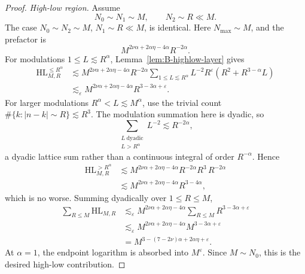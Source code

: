 \documentclass[10pt]{amsart}
\numberwithin{equation}{section}
\theoremstyle{plain}
\theoremstyle{definition}
\theoremstyle{remark}
\newcommand{\eps}{\varepsilon}
\begin{document}
\begin{proof}
\emph{High-low region.}  Assume
\[
        N_0\sim N_1\sim M,
        \qquad
        N_2\sim R\ll M.
\]
The case \(N_0\sim N_2\sim M\), \(N_1\sim R\ll M\), is identical.  Here \(N_{\max}\sim M\), and the prefactor is
\[
        M^{2\nu\alpha+2\alpha\eta-4\alpha}R^{-2\alpha}.
\]
For modulations \(1\le L\lesssim R^\alpha\), Lemma~\ref{lem:B-highlow-layer} gives
\[
\begin{aligned}
        \mathrm{HL}_{M,R}^{\le R^\alpha}
        &\lesssim
        M^{2\nu\alpha+2\alpha\eta-4\alpha}R^{-2\alpha}
        \sum_{1\le L\lesssim R^\alpha}
        L^{-2}R^\eps(R^2+R^{3-\alpha}L) \\
        &\lesssim_\eps
        M^{2\nu\alpha+2\alpha\eta-4\alpha}R^{3-3\alpha+\eps}.
\end{aligned}
\]
For larger modulations \(R^\alpha<L\lesssim M^\alpha\), use the trivial count \(\#\{k:|n-k|\sim R\}\lesssim R^3\).  The modulation summation here is dyadic, so
\[
        \sum_{\substack{L\ \mathrm{dyadic}\\ L>R^\alpha}}L^{-2}\lesssim R^{-2\alpha},
\]
a dyadic lattice sum rather than a continuous integral of order \(R^{-\alpha}\).  Hence
\[
\begin{aligned}
        \mathrm{HL}_{M,R}^{>R^\alpha}
        &\lesssim
        M^{2\nu\alpha+2\alpha\eta-4\alpha}R^{-2\alpha}R^3
        \,R^{-2\alpha} \\
        &\lesssim
        M^{2\nu\alpha+2\alpha\eta-4\alpha}R^{3-4\alpha},
\end{aligned}
\]
which is no worse.  Summing dyadically over \(1\le R\le M\),
\[
\begin{aligned}
        \sum_{R\le M}\mathrm{HL}_{M,R}
        &\lesssim_\eps
        M^{2\nu\alpha+2\alpha\eta-4\alpha}
        \sum_{R\le M}R^{3-3\alpha+\eps} \\
        &\lesssim_\eps
        M^{2\nu\alpha+2\alpha\eta-4\alpha}M^{3-3\alpha+\eps} \\
        &=M^{3-(7-2\nu)\alpha+2\alpha\eta+\eps}.
\end{aligned}
\]
At \(\alpha=1\), the endpoint logarithm is absorbed into \(M^\eps\).  Since \(M\sim N_0\), this is the desired high-low contribution.


\end{proof}
\end{document}
